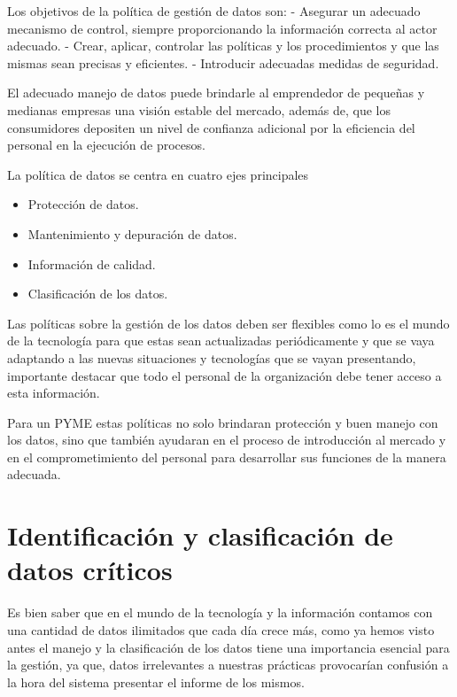 \documentclass[
  letterpaper,
  DIV=11,
  numbers=noendperiod]{scrreprt}
\providecommand{\tightlist}{%
  \setlength{\itemsep}{0pt}\setlength{\parskip}{0pt}}\usepackage{longtable,booktabs,array}
\begin{document}
Los objetivos de la política de gestión de datos son: - Asegurar un
adecuado mecanismo de control, siempre proporcionando la información
correcta al actor adecuado. - Crear, aplicar, controlar las políticas y
los procedimientos y que las mismas sean precisas y eficientes. -
Introducir adecuadas medidas de seguridad.

El adecuado manejo de datos puede brindarle al emprendedor de pequeñas y
medianas empresas una visión estable del mercado, además de, que los
consumidores depositen un nivel de confianza adicional por la eficiencia
del personal en la ejecución de procesos.

La política de datos se centra en cuatro ejes principales

\begin{itemize}
\tightlist
\item
  Protección de datos.
\item
  Mantenimiento y depuración de datos.
\item
  Información de calidad.
\item
  Clasificación de los datos.
\end{itemize}

Las políticas sobre la gestión de los datos deben ser flexibles como lo
es el mundo de la tecnología para que estas sean actualizadas
periódicamente y que se vaya adaptando a las nuevas situaciones y
tecnologías que se vayan presentando, importante destacar que todo el
personal de la organización debe tener acceso a esta información.

Para un PYME estas políticas no solo brindaran protección y buen manejo
con los datos, sino que también ayudaran en el proceso de introducción
al mercado y en el comprometimiento del personal para desarrollar sus
funciones de la manera adecuada.

\hypertarget{identificaciuxf3n-y-clasificaciuxf3n-de-datos-cruxedticos}{%
\section{Identificación y clasificación de datos
críticos}\label{identificaciuxf3n-y-clasificaciuxf3n-de-datos-cruxedticos}}

Es bien saber que en el mundo de la tecnología y la información contamos
con una cantidad de datos ilimitados que cada día crece más, como ya
hemos visto antes el manejo y la clasificación de los datos tiene una
importancia esencial para la gestión, ya que, datos irrelevantes a
nuestras prácticas provocarían confusión a la hora del sistema presentar
el informe de los mismos.
\end{document}
